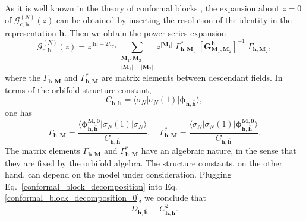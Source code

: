\documentclass[a4paper,11pt]{article}
\begin{document}
As it is well known in the theory of conformal blocks \cite{DiFrancesco}, the expansion about $z=0$ of $\mathcal{G}_{c, \boldsymbol{h}}^{(N)}(z)$ can be obtained by inserting the resolution of the identity in the representation $\boldsymbol{h}$. Then we obtain the power series expansion
\begin{equation}\label{conformal_block_decomposition}
 \mathcal{G}_{c,\boldsymbol{h}}^{(N)}(z)=
 z^{|\boldsymbol{h}|-2h_{\sigma_N}}\sum_{\substack{\boldsymbol{M}_1, \boldsymbol{M}_2 \\ |\boldsymbol{M}_1|=|\boldsymbol{M}_2|} } z^{|\boldsymbol{M}_1|}\;\Gamma^{*}_{\boldsymbol{h}, \boldsymbol{M}_1}\; [\boldsymbol{G}^{\boldsymbol{h}}_{\boldsymbol{M}_1,\boldsymbol{M}_2}]^{-1}\;\Gamma_{\boldsymbol{h},\boldsymbol{M}_2},
\end{equation}
where the $\Gamma_{\boldsymbol{h},\boldsymbol{M}}$ and $\Gamma^{*}_{\boldsymbol{h},\boldsymbol{M}}$ are matrix elements between descendant fields. In terms of the orbifold structure constant,
\begin{equation}
\label{strucconst}
C_{\boldsymbol{h},\boldsymbol{\bar{h}}}=\langle  \sigma_{N}|\bar{\sigma}_{N}(1)|\boldsymbol{\phi}_{\boldsymbol{h},\boldsymbol{\bar{h}}}\rangle,
\end{equation}
one has
 \begin{equation}
 \label{Gammas}
\Gamma_{\boldsymbol{h},\boldsymbol{M}} = \frac{\langle \boldsymbol{\phi}^{\boldsymbol{M},\boldsymbol{0}}_{\boldsymbol{h},\boldsymbol{\bar{h}}}| \sigma_{N}(1)|\bar{\sigma}_{N}\rangle}{C_{\boldsymbol{h},\boldsymbol{\bar{h}}}},\quad  \Gamma^{*}_{\boldsymbol{h},\boldsymbol{M}} = \frac{\langle  \sigma_{N}|\bar{\sigma}_{N}(1)|\boldsymbol{\phi}^{\boldsymbol{M},\boldsymbol{0}}_{\boldsymbol{h},\boldsymbol{\bar{h}}}\rangle}{C_{\boldsymbol{h},\boldsymbol{\bar{h}}}} .
 \end{equation}
 The matrix elements  $\Gamma_{\boldsymbol{h},\boldsymbol{M}}$ and $\Gamma^{*}_{\boldsymbol{h},\boldsymbol{M}}$ have an algebraic nature, in the sense that they are fixed by the orbifold algebra. The structure constants, on the other hand, can depend on the model under consideration. Plugging Eq.~\eqref{conformal_block_decomposition} into Eq.\eqref{conformal_block_decomposition_0}, we conclude that 
 \begin{equation}
 \label{DC}
 D_{\boldsymbol{h},\boldsymbol{\bar{h}}}= C_{\boldsymbol{h},\boldsymbol{\bar{h}}}^2.
 \end{equation}
\end{document}
